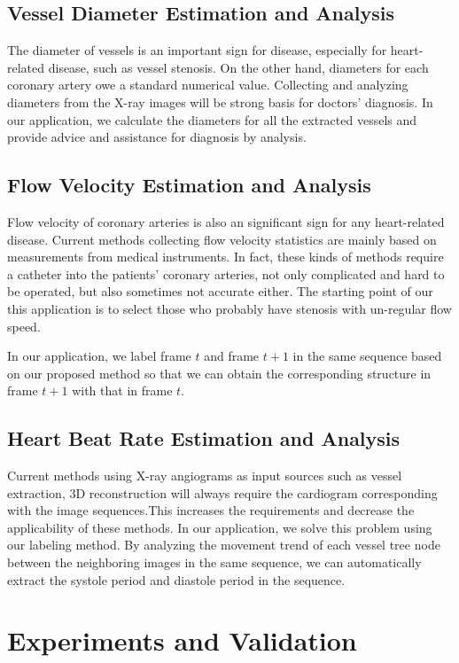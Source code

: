 \documentclass[journal]{IEEEtran}
\begin{document}
\label{sec:application}
\subsection{Vessel Diameter Estimation and Analysis}
The diameter of vessels is an important sign for disease, especially for heart-related disease, such as vessel stenosis. On the other hand, diameters for each coronary artery owe a standard numerical value. Collecting and analyzing diameters from the X-ray images will be strong basis for doctors' diagnosis. In our application, we calculate the diameters for all the extracted vessels and provide advice and assistance for diagnosis by analysis. 

\subsection{Flow Velocity Estimation and Analysis}
Flow velocity of coronary arteries is also an significant sign for any heart-related disease. Current methods collecting flow velocity statistics are mainly based on measurements from medical instruments. In fact, these kinds of methods require a catheter into the patients' coronary arteries, not only complicated and hard to be operated, but also sometimes not accurate either. The starting point of our this application is to select those who probably have stenosis with un-regular flow speed.

In our application, we label frame $t$ and frame $t+1$ in the same sequence based on our proposed method so that we can obtain the corresponding structure in frame $t+1$ with that in frame $t$. 

\subsection{Heart Beat Rate Estimation and Analysis}
Current methods using X-ray angiograms as input sources such as vessel extraction, 3D reconstruction will always require the cardiogram corresponding with the image sequences.This increases the requirements and decrease the applicability of these methods. In our application, we solve this problem using our labeling method. By analyzing the movement trend of each vessel tree node between the neighboring images in the same sequence, we can automatically extract the systole period and diastole period in the sequence.


\section{Experiments and Validation}
\end{document}
